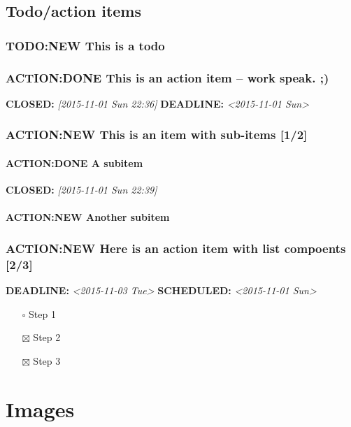 \documentclass[11pt]{article}
\begin{document}
\subsection{Todo/action items}
\label{sec:org3d228d8}

\subsubsection{{\bfseries\sffamily TODO:NEW} This is a todo}
\label{sec:org2a33bd0}

\subsubsection{ACTION:DONE This is an action item -- work speak. ;)}
\label{sec:org6c86cc4}
\noindent\textbf{CLOSED:} \textit{[2015-11-01 Sun 22:36] } \textbf{DEADLINE:} \textit{<2015-11-01 Sun>}\\

\subsubsection{ACTION:NEW This is an item with sub-items [1/2]}
\label{sec:org6fec9c6}
\paragraph{ACTION:DONE A subitem}
\label{sec:org66be05a}
\noindent\textbf{CLOSED:} \textit{[2015-11-01 Sun 22:39]}\\
\paragraph{ACTION:NEW Another subitem}
\label{sec:orge61390b}

\subsubsection{ACTION:NEW Here is an action item with list compoents [2/3]}
\label{sec:orge7f6372}
\noindent\textbf{DEADLINE:} \textit{<2015-11-03 Tue> } \textbf{SCHEDULED:} \textit{<2015-11-01 Sun>}\\
\begin{itemize}
\item[{$\square$}] Step 1
\item[{$\boxtimes$}] Step 2
\item[{$\boxtimes$}] Step 3
\end{itemize}

\section{Images}
\label{sec:org310fb5b}
\end{document}

